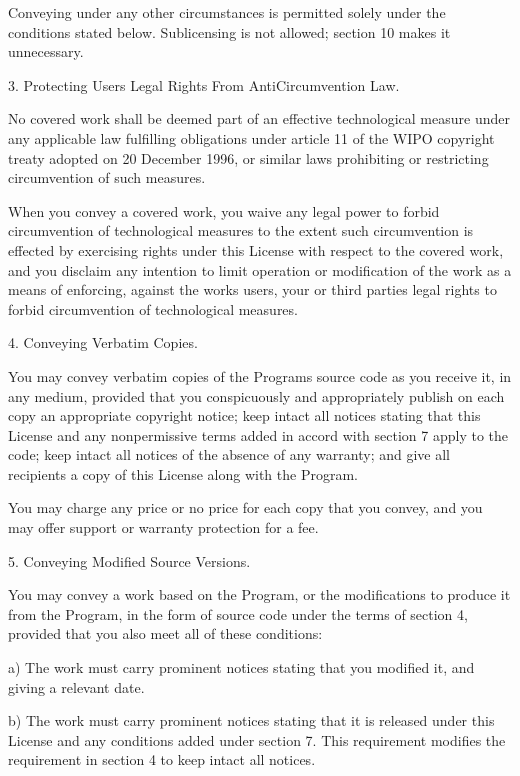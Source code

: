 \documentclass[letterpaper,10pt,english]{sphinxmanual}
\begin{document}
\begin{sphinxVerbatim}[commandchars=\\\{\}]
  Conveying under any other circumstances is permitted solely under
the conditions stated below.  Sublicensing is not allowed; section 10
makes it unnecessary.

  3. Protecting Users\PYGZsq{} Legal Rights From Anti\PYGZhy{}Circumvention Law.

  No covered work shall be deemed part of an effective technological
measure under any applicable law fulfilling obligations under article
11 of the WIPO copyright treaty adopted on 20 December 1996, or
similar laws prohibiting or restricting circumvention of such
measures.

  When you convey a covered work, you waive any legal power to forbid
circumvention of technological measures to the extent such circumvention
is effected by exercising rights under this License with respect to
the covered work, and you disclaim any intention to limit operation or
modification of the work as a means of enforcing, against the work\PYGZsq{}s
users, your or third parties\PYGZsq{} legal rights to forbid circumvention of
technological measures.

  4. Conveying Verbatim Copies.

  You may convey verbatim copies of the Program\PYGZsq{}s source code as you
receive it, in any medium, provided that you conspicuously and
appropriately publish on each copy an appropriate copyright notice;
keep intact all notices stating that this License and any
non\PYGZhy{}permissive terms added in accord with section 7 apply to the code;
keep intact all notices of the absence of any warranty; and give all
recipients a copy of this License along with the Program.

  You may charge any price or no price for each copy that you convey,
and you may offer support or warranty protection for a fee.

  5. Conveying Modified Source Versions.

  You may convey a work based on the Program, or the modifications to
produce it from the Program, in the form of source code under the
terms of section 4, provided that you also meet all of these conditions:

    a) The work must carry prominent notices stating that you modified
    it, and giving a relevant date.

    b) The work must carry prominent notices stating that it is
    released under this License and any conditions added under section
    7.  This requirement modifies the requirement in section 4 to
    \PYGZdq{}keep intact all notices\PYGZdq{}.


\end{sphinxVerbatim}
\end{document}
